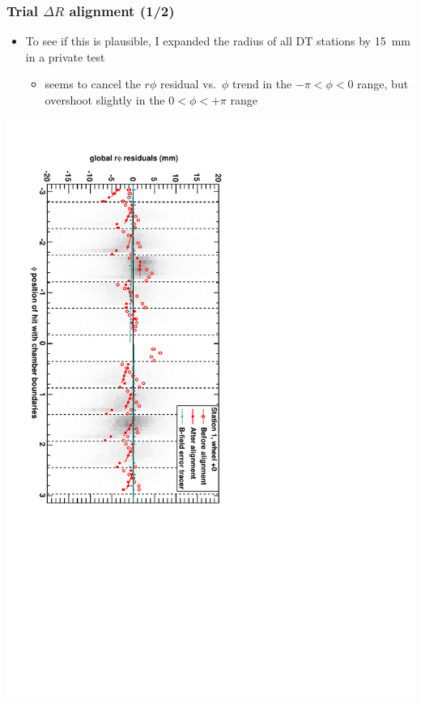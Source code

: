 \documentclass[compress]{beamer}
\begin{document}
\begin{frame}
\frametitle{Trial $\Delta R$ alignment (1/2)}

\begin{itemize}
\item To see if this is plausible, I expanded the radius of all DT stations by 15~mm in a private test
\begin{itemize}
\item seems to cancel the $r\phi$ residual vs.\ $\phi$ trend in the $-\pi < \phi < 0$ range, but overshoot slightly in the $0 < \phi < +\pi$ range
\end{itemize}
\end{itemize}

\includegraphics[height=\linewidth, angle=90]{DTrphiVsPhi_st1_whC_out15mm.pdf}
\end{frame}
\end{document}
